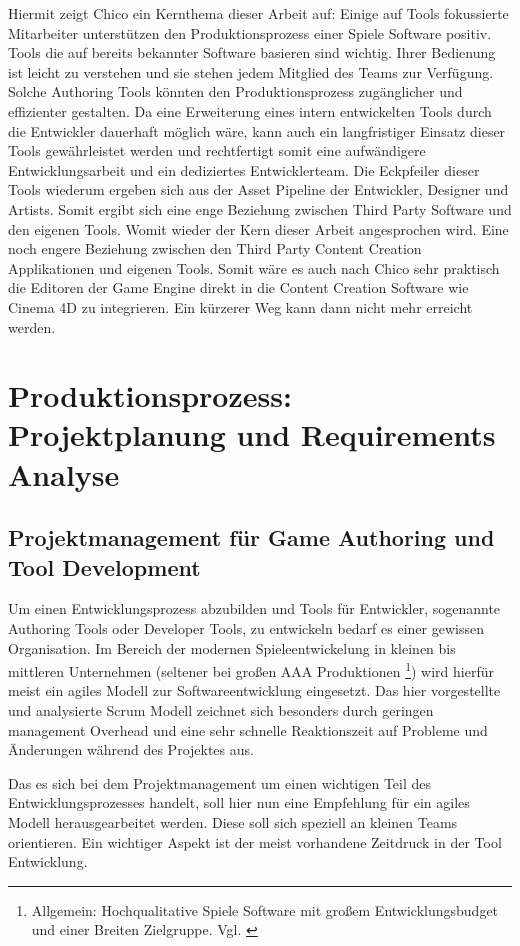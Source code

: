 \documentclass[pagesize, paper=a4, fontsize=12pt, titlepage=true, headings=small, headnosepline, abstractoff, liststotoc, nochapterprefix, plainheadsepline, twoside]{scrreprt}
\begin{document}
Hiermit zeigt Chico ein Kernthema dieser Arbeit auf: Einige auf Tools fokussierte Mitarbeiter unterstützen den Produktionsprozess einer Spiele Software positiv. Tools die auf bereits bekannter Software basieren sind wichtig. Ihrer Bedienung ist leicht zu verstehen und sie stehen jedem Mitglied des Teams zur Verfügung. Solche Authoring Tools könnten den Produktionsprozess zugänglicher und effizienter gestalten. Da eine Erweiterung eines intern entwickelten Tools durch die Entwickler dauerhaft möglich wäre, kann auch ein langfristiger Einsatz dieser Tools gewährleistet werden und rechtfertigt somit eine aufwändigere Entwicklungsarbeit und ein dediziertes Entwicklerteam. Die Eckpfeiler dieser Tools wiederum ergeben sich aus der Asset Pipeline der Entwickler, Designer und Artists. Somit ergibt sich eine enge Beziehung zwischen Third Party Software und den eigenen Tools. Womit wieder der Kern dieser Arbeit angesprochen wird. Eine noch engere Beziehung zwischen den Third Party Content Creation Applikationen und eigenen Tools. Somit wäre es auch nach Chico sehr praktisch die Editoren der Game Engine direkt in die Content Creation Software wie Cinema 4D zu integrieren. Ein kürzerer Weg kann dann nicht mehr erreicht werden.

\chapter{Produktionsprozess: Projektplanung und Requirements Analyse}
\section{Projektmanagement für Game Authoring und Tool Development}
Um einen Entwicklungsprozess abzubilden und Tools für Entwickler, sogenannte Authoring Tools oder Developer Tools, zu entwickeln bedarf es einer gewissen Organisation. Im Bereich der modernen Spieleentwickelung in kleinen bis mittleren Unternehmen (seltener bei großen AAA Produktionen \footnote{Allgemein: Hochqualitative Spiele Software mit großem Entwicklungsbudget und einer Breiten Zielgruppe. Vgl. \cite{GamasutraAAA2005} }) wird hierfür meist ein agiles Modell zur Softwareentwicklung eingesetzt. Das hier vorgestellte und analysierte Scrum Modell zeichnet sich besonders durch geringen management Overhead und eine sehr schnelle Reaktionszeit auf Probleme und Änderungen während des Projektes aus.

Das es sich bei dem Projektmanagement um einen wichtigen Teil des Entwicklungsprozesses handelt, soll hier nun eine Empfehlung für ein agiles Modell herausgearbeitet werden. Diese soll sich speziell an kleinen Teams orientieren. Ein wichtiger Aspekt ist der meist vorhandene Zeitdruck in der Tool Entwicklung. 
\end{document}
